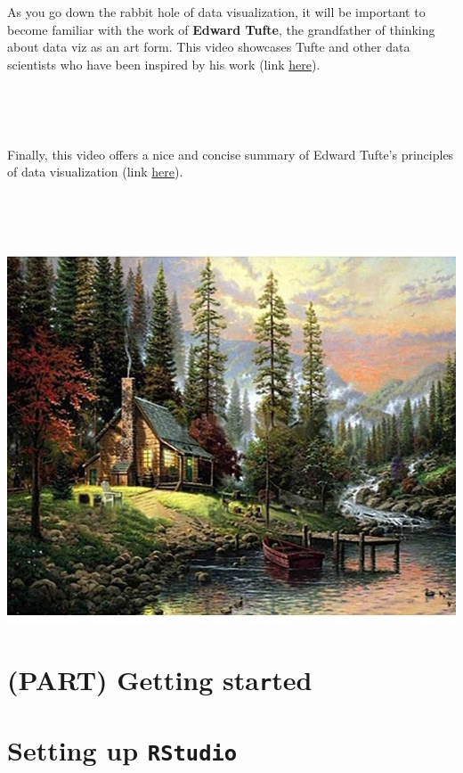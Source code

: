 \documentclass[]{book}
\begin{document}
As you go down the rabbit hole of data visualization, it will be important to become familiar with the work of \textbf{Edward Tufte}, the grandfather of thinking about data viz as an art form. This video showcases Tufte and other data scientists who have been inspired by his work (link \href{https://www.youtube.com/watch?v=AdSZJzb-aX8}{here}).

~

~

Finally, this video offers a nice and concise summary of Edward Tufte's principles of data visualization (link \href{https://www.youtube.com/watch?v=r7YdcZkS_1k}{here}).

~

~\\
\hspace*{0.333em}

\includegraphics{img/vis-painting.jpeg}

\hypertarget{part-getting-started}{%
\chapter*{\texorpdfstring{(PART) Getting sta\texttt{r}ted}{(PART) Getting started}}\label{part-getting-started}}

\hypertarget{setting-up-rstudio}{%
\chapter{\texorpdfstring{Setting up \texttt{RStudio}}{Setting up RStudio}}\label{setting-up-rstudio}}
\end{document}
